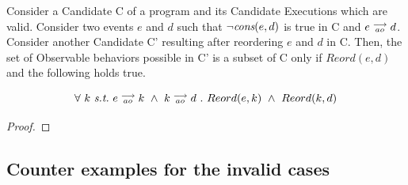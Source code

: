 \begin{corollary}
    Consider a Candidate C of a program and its Candidate Executions which are valid. Consider two events $e$ and $d$ such that $\neg \textit{cons}(e,d)$ is true in C and $e\stackrel{\longrightarrow}{_{ao}}d$. Consider another Candidate C' resulting after reordering $e$ and $d$ in C. Then, the set of Observable behaviors possible in C' is a subset of C only if $Reord(e,d)$ and the following holds true.
    
    \[
        \forall \ k \ \textit{s.t.} \ 
        \reln{e}{ao}{k} \ \wedge \ \reln{k}{ao}{d} \ . \ 
        Reord(e,k) \ \wedge \ Reord(k,d)
    \]
    
\end{corollary}
    
\begin{proof}
    
\end{proof}
    
\subsection{Counter examples for the invalid cases}

\subsection{}

    

    
    
    
    
    
